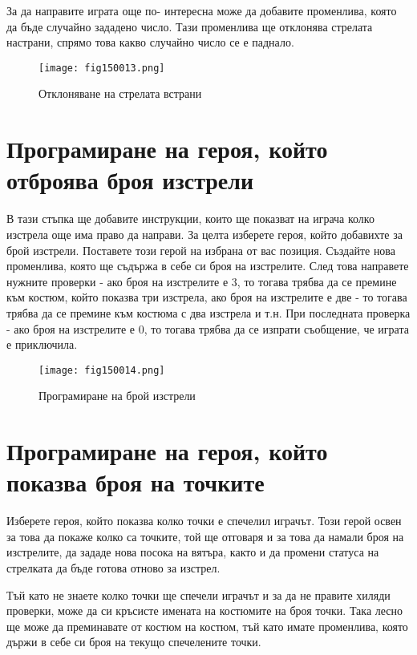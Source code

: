 За да направите играта още по- интересна може да добавите променлива, която да бъде случайно зададено число. Тази променлива ще отклонява стрелата настрани, спрямо това какво случайно число се е паднало.

\begin{figure}[H]
  \centering
  \texttt{[image: fig150013.png]}
  \caption{Отклоняване на стрелата встрани}
\label{fig150013}
\end{figure}

\section{Програмиране на героя, който отброява броя изстрели}

В тази стъпка ще добавите инструкции, които ще показват на играча колко изстрела още има право да направи. За целта изберете героя, който добавихте за брой изстрели. Поставете този герой на избрана от вас позиция. Създайте нова променлива, която ще съдържа в себе си броя на изстрелите. След това направете нужните проверки - ако броя на изстрелите е 3, то тогава трябва да се премине към костюм, който показва три изстрела, ако броя на изстрелите е две - то тогава трябва да се премине към костюма с два изстрела и т.н. При последната проверка - ако броя на изстрелите е 0, то тогава трябва да се изпрати съобщение, че играта е приключила.

\begin{figure}[H]
  \centering
  \texttt{[image: fig150014.png]}
  \caption{Програмиране на брой изстрели}
\label{fig150014}
\end{figure}

\section{Програмиране на героя, който показва броя на точките}

Изберете героя, който показва колко точки е спечелил играчът. Този герой освен за това да покаже колко са точките, той ще отговаря и за това да намали броя на изстрелите, да зададе нова посока на вятъра, както и да промени статуса на стрелката да бъде готова отново за изстрел.

Тъй като не знаете колко точки ще спечели играчът и за да не правите хиляди проверки, може да си кръсисте имената на костюмите на броя точки. Така лесно ще може да преминавате от костюм на костюм, тъй като имате променлива, която държи в себе си броя на текущо спечелените точки.

